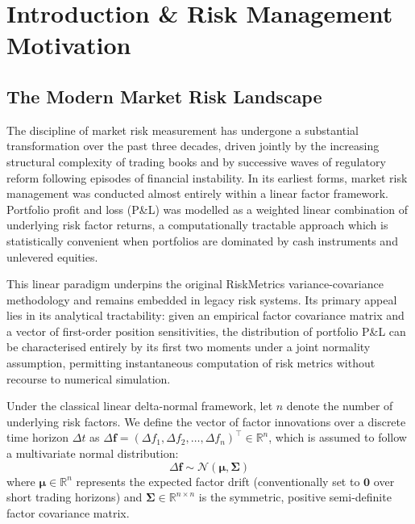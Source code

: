\documentclass{article}
\theoremstyle{plain}
\theoremstyle{definition}
\theoremstyle{remark}
\begin{document}
\section{Introduction \& Risk Management Motivation}

\subsection{The Modern Market Risk Landscape}
The discipline of market risk measurement has undergone a substantial transformation over the past three decades, driven jointly by the increasing structural complexity of trading books and by successive waves of regulatory reform following episodes of financial instability. In its earliest forms, market risk management was conducted almost entirely within a linear factor framework. Portfolio profit and loss (P\&L) was modelled as a weighted linear combination of underlying risk factor returns, a computationally tractable approach which is statistically convenient when portfolios are dominated by cash instruments and unlevered equities.

This linear paradigm underpins the original RiskMetrics variance-covariance methodology and remains embedded in legacy risk systems. Its primary appeal lies in its analytical tractability: given an empirical factor covariance matrix and a vector of first-order position sensitivities, the distribution of portfolio P\&L can be characterised entirely by its first two moments under a joint normality assumption, permitting instantaneous computation of risk metrics without recourse to numerical simulation.

Under the classical linear delta-normal framework, let $n$ denote the number of underlying risk factors. We define the vector of factor innovations over a discrete time horizon $\Delta t$ as $\Delta \mathbf{f} = (\Delta f_1, \Delta f_2, \dots, \Delta f_n)^\top \in \mathbb{R}^n$, which is assumed to follow a multivariate normal distribution:
\begin{equation}
    \Delta \mathbf{f} \sim \mathcal{N}(\boldsymbol{\mu}, \mathbf{\Sigma})
\end{equation}
where $\boldsymbol{\mu} \in \mathbb{R}^n$ represents the expected factor drift (conventionally set to $\mathbf{0}$ over short trading horizons) and $\mathbf{\Sigma} \in \mathbb{R}^{n \times n}$ is the symmetric, positive semi-definite factor covariance matrix.
\end{document}
